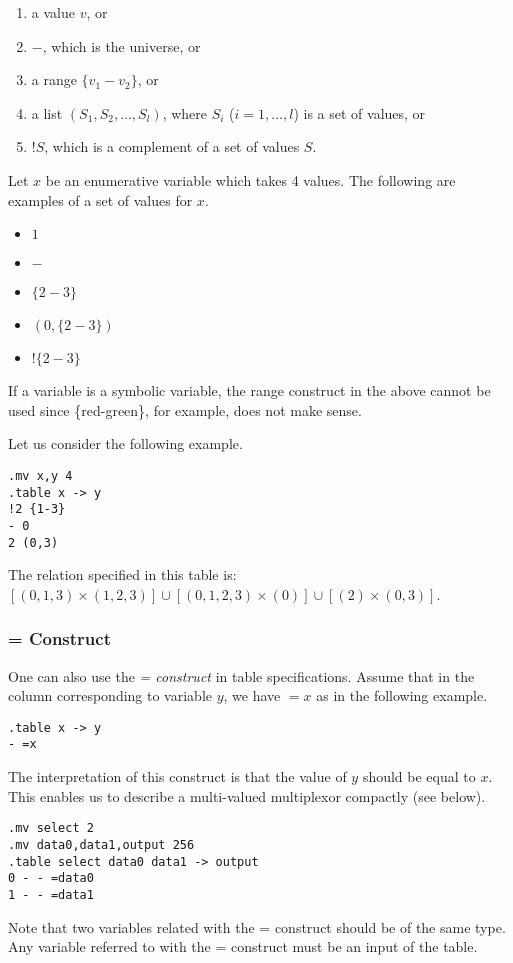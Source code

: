 \begin{enumerate}
\item a value $v$, or
\item $-$, which is the universe, or
\item a range $\{v_1 - v_2\}$, or
\item a list $(S_1, S_2, \ldots, S_l)$, where $S_i$ ($i=1,\ldots,l$) is a set of values, or
\item $!S$, which is a complement of a set of values $S$.
\end{enumerate}

Let $x$ be an enumerative variable which takes 4 values.
The following are examples of a set of values
for $x$.

\begin{itemize}
\item $1$
\item $-$
\item $\{2-3\}$
\item $(0,\{2-3\})$
\item $!\{2-3\}$
\end{itemize}

If a variable is a symbolic variable, the range construct
in the above cannot be used since \{red-green\}, for example,
does not make sense.

Let us consider the following example.

\begin{verbatim}
.mv x,y 4
.table x -> y
!2 {1-3}
- 0
2 (0,3)
\end{verbatim}

The relation specified in this table is:
$[(0,1,3) \times (1,2,3)] \cup
[(0,1,2,3) \times (0)] \cup
[(2) \times (0,3)]$.

\subsubsection{= Construct}
One can also use the {\em = construct}
in table specifications.
Assume that in the column
corresponding to variable $y$,
we have $=x$ as in the following example.

\begin{verbatim}
.table x -> y
- =x
\end{verbatim}

The interpretation of this construct is that
the value of $y$ should be equal to $x$.
This enables us to describe a multi-valued multiplexor
compactly (see below).
\begin{verbatim}
.mv select 2
.mv data0,data1,output 256
.table select data0 data1 -> output
0 - - =data0
1 - - =data1
\end{verbatim}
Note that two variables related with the = construct should be
of the same type.
Any variable referred to with the = construct
must be an input of the table.

